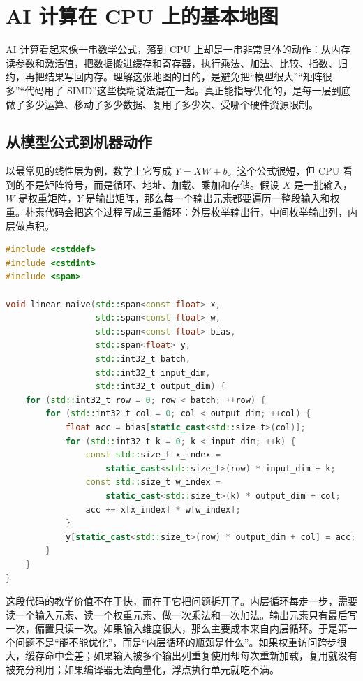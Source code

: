 \chapter{AI 计算在 CPU 上的基本地图}

AI 计算看起来像一串数学公式，落到 CPU 上却是一串非常具体的动作：从内存读参数和激活值，把数据搬进缓存和寄存器，执行乘法、加法、比较、指数、归约，再把结果写回内存。理解这张地图的目的，是避免把“模型很大”“矩阵很多”“代码用了 SIMD”这些模糊说法混在一起。真正能指导优化的，是每一层到底做了多少运算、移动了多少数据、复用了多少次、受哪个硬件资源限制。

\section{从模型公式到机器动作}

以最常见的线性层为例，数学上它写成 $Y = XW + b$。这个公式很短，但 CPU 看到的不是矩阵符号，而是循环、地址、加载、乘加和存储。假设 $X$ 是一批输入，$W$ 是权重矩阵，$Y$ 是输出矩阵，那么每一个输出元素都要遍历一整段输入和权重。朴素代码会把这个过程写成三重循环：外层枚举输出行，中间枚举输出列，内层做点积。

\begin{lstlisting}[language=C++,caption={线性层的朴素三重循环}]
#include <cstddef>
#include <cstdint>
#include <span>

void linear_naive(std::span<const float> x,
                  std::span<const float> w,
                  std::span<const float> bias,
                  std::span<float> y,
                  std::int32_t batch,
                  std::int32_t input_dim,
                  std::int32_t output_dim) {
    for (std::int32_t row = 0; row < batch; ++row) {
        for (std::int32_t col = 0; col < output_dim; ++col) {
            float acc = bias[static_cast<std::size_t>(col)];
            for (std::int32_t k = 0; k < input_dim; ++k) {
                const std::size_t x_index =
                    static_cast<std::size_t>(row) * input_dim + k;
                const std::size_t w_index =
                    static_cast<std::size_t>(k) * output_dim + col;
                acc += x[x_index] * w[w_index];
            }
            y[static_cast<std::size_t>(row) * output_dim + col] = acc;
        }
    }
}
\end{lstlisting}

这段代码的教学价值不在于快，而在于它把问题拆开了。内层循环每走一步，需要读一个输入元素、读一个权重元素、做一次乘法和一次加法。输出元素只有最后写一次，偏置只读一次。如果输入维度很大，那么主要成本来自内层循环。于是第一个问题不是“能不能优化”，而是“内层循环的瓶颈是什么”。如果权重访问跨步很大，缓存命中会差；如果输入被多个输出列重复使用却每次重新加载，复用就没有被充分利用；如果编译器无法向量化，浮点执行单元就吃不满。

